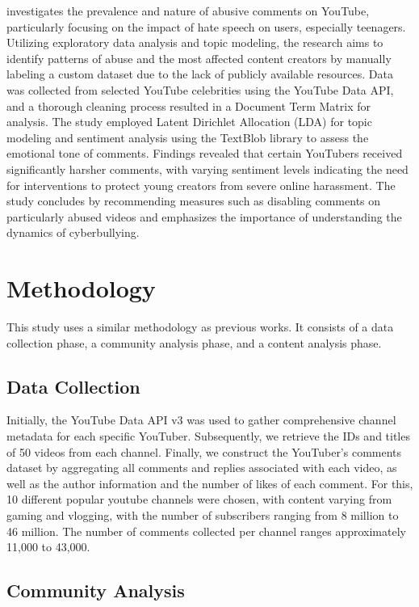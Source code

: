 \documentclass[12pt]{article}
\begin{document}
\cite{shekar2021} investigates the prevalence and nature of abusive comments on YouTube, 
particularly focusing on the impact of hate speech on users, especially teenagers. 
Utilizing exploratory data analysis and topic modeling, the research aims to identify patterns of 
abuse and the most affected content creators by manually labeling a custom dataset due to the lack 
of publicly available resources. Data was collected from selected YouTube celebrities using the 
YouTube Data API, and a thorough cleaning process resulted in a Document Term Matrix for analysis. 
The study employed Latent Dirichlet Allocation (LDA) for topic modeling and sentiment analysis using 
the TextBlob library to assess the emotional tone of comments. Findings revealed that certain 
YouTubers received significantly harsher comments, with varying sentiment levels indicating the 
need for interventions to protect young creators from severe online harassment. 
The study concludes by recommending measures such as disabling comments on particularly abused 
videos and emphasizes the importance of understanding the dynamics of cyberbullying.

\section{Methodology}

This study uses a similar methodology as previous works. It consists of a data collection phase, 
a community analysis phase, and a content analysis phase.

\subsection{Data Collection}

Initially, the YouTube Data API v3 was used to gather comprehensive channel metadata for each 
specific YouTuber. Subsequently, we retrieve the IDs and titles of 50 videos from each channel. 
Finally, we construct the YouTuber's comments dataset by aggregating all comments and replies 
associated with each video, as well as the author information and the number of likes of each comment. 
For this, 10 different popular youtube channels were chosen, with content varying from gaming and 
vlogging, with the number of subscribers ranging from 8 million to 46 million. The number of comments
collected per channel ranges approximately 11,000 to 43,000.


\subsection{Community Analysis}
\end{document}
